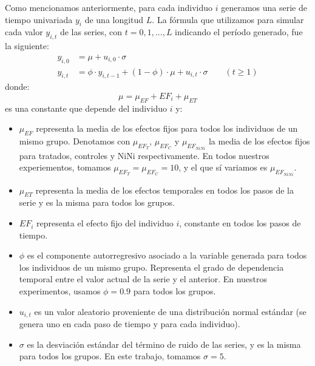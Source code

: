 \documentclass[../../main.tex]{subfiles}
\begin{document}
Como mencionamos anteriormente, para cada individuo \(i\) generamos una serie de tiempo
univariada \(y_i\) de una longitud \(L\). La fórmula que utilizamos para simular cada
valor \(y_{i,t}\) de las series, con \(t = 0, 1, ..., L\) indicando el período generado,
fue la siguiente:
\begin{align}
    y_{i,0} &= \mu + u_{i,0} \cdot \sigma \\
    y_{i,t} &= \phi \cdot y_{i,t-1} + (1 - \phi) \cdot \mu +  u_{i,t} \cdot \sigma \qquad (t \ge 1)
\end{align}
donde:
\[
    \mu = \mu_{EF} + EF_i + \mu_{ET}
\]
es una constante que depende del individuo \(i\) y:
\begin{itemize}[itemsep=0.1cm]
    \item \(\mu_{EF}\) representa la media de los efectos fijos para todos los individuos
    de un mismo grupo. Denotamos con \(\mu_{{EF}_T}\), \(\mu_{{EF}_C}\) y
    \(\mu_{{EF}_{NiNi}}\) la media de los efectos fijos para tratados, controles y NiNi
    respectivamente. En todos nuestros experiementos, tomamos \(\mu_{{EF}_T} =
    \mu_{{EF}_C} = 10\), y el que sí variamos es \(\mu_{{EF}_{NiNi}}\).
    \item \(\mu_{ET}\) representa la media de los efectos temporales en todos los pasos
    de la serie y es la misma para todos los grupos.
    \item \(EF_i\) representa el efecto fijo del individuo \(i\), constante en todos
    los pasos de tiempo.
    \item \(\phi\) es el componente autorregresivo asociado a la variable generada para
    todos los individuos de un mismo grupo. Representa el grado de dependencia temporal
    entre el valor actual de la serie y el anterior. En nuestros experimentos, usamos
    \(\phi = 0.9\) para todos los grupos.
    \item \(u_{i,t}\) es un valor aleatorio proveniente de una distribución normal
    estándar (se genera uno en cada paso de tiempo y para cada individuo).
    \item \(\sigma\) es la desviación estándar del término de ruido de las series,
    y es la misma para todos los grupos. En este trabajo, tomamos \(\sigma=5\).
\end{itemize}
\end{document}
